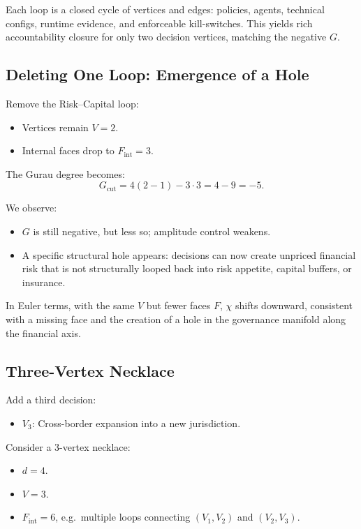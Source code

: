 \documentclass[11pt]{article}
\begin{document}
Each loop is a closed cycle of vertices and edges: policies, agents, technical configs, runtime evidence, and enforceable kill-switches. This yields rich accountability closure for only two decision vertices, matching the negative \(G\).

\subsection{Deleting One Loop: Emergence of a Hole}

Remove the Risk–Capital loop:
\begin{itemize}
  \item Vertices remain \(V = 2\).
  \item Internal faces drop to \(F_{\text{int}} = 3\).
\end{itemize}

The Gurau degree becomes:
\[
G_{\text{cut}} = 4(2 - 1) - 3\cdot 3 = 4 - 9 = -5.
\]

We observe:
\begin{itemize}
  \item \(G\) is still negative, but less so; amplitude control weakens.
  \item A specific structural hole appears: decisions can now create unpriced financial risk that is not structurally looped back into risk appetite, capital buffers, or insurance.
\end{itemize}

In Euler terms, with the same \(V\) but fewer faces \(F\), \(\chi\) shifts downward, consistent with a missing face and the creation of a hole in the governance manifold along the financial axis.

\subsection{Three-Vertex Necklace}

Add a third decision:
\begin{itemize}
  \item \(V_3\): Cross-border expansion into a new jurisdiction.
\end{itemize}

Consider a 3-vertex necklace:
\begin{itemize}
  \item \(d = 4\).
  \item \(V = 3\).
  \item \(F_{\text{int}} = 6\), e.g.\ multiple loops connecting \((V_1, V_2)\) and \((V_2, V_3)\).
\end{itemize}
\end{document}
